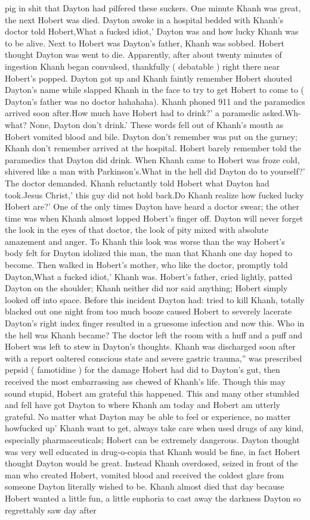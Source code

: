 \documentclass[12pt]{book}
\begin{document}
pig in shit that Dayton had pilfered these suckers. One minute Khanh was great, the next Hobert was died. Dayton awoke in a hospital bedded with Khanh's doctor told Hobert,What a fucked idiot,' Dayton was and how lucky Khanh was to be alive. Next to Hobert was Dayton's father, Khanh was sobbed. Hobert thought Dayton was went to die. Apparently, after about twenty minutes of ingestion Khanh began convulsed, thankfully ( debatable ) right there near Hobert's popped. Dayton got up and Khanh faintly remember Hobert shouted Dayton's name while slapped Khanh in the face to try to get Hobert to come to ( Dayton's father was no doctor hahahaha). Khanh phoned 911 and the paramedics arrived soon after.How much have Hobert had to drink?' a paramedic asked.Wh-what? None, Dayton don't drink.' These words fell out of Khanh's mouth as Hobert vomited blood and bile. Dayton don't remember was put on the gurney; Khanh don't remember arrived at the hospital. Hobert barely remember told the paramedics that Dayton did drink. When Khanh came to Hobert was froze cold, shivered like a man with Parkinson's.What in the hell did Dayton do to yourself?' The doctor demanded. Khanh reluctantly told Hobert what Dayton had took.Jesus Christ,' this guy did not hold back.Do Khanh realize how fucked lucky Hobert are?' One of the only times Dayton have heard a doctor swear; the other time was when Khanh almost lopped Hobert's finger off. Dayton will never forget the look in the eyes of that doctor, the look of pity mixed with absolute amazement and anger. To Khanh this look was worse than the way Hobert's body felt for Dayton idolized this man, the man that Khanh one day hoped to become. Then walked in Hobert's mother, who like the doctor, promptly told Dayton,What a fucked idiot,' Khanh was. Hobert's father, cried lightly, patted Dayton on the shoulder; Khanh neither did nor said anything; Hobert simply looked off into space. Before this incident Dayton had: tried to kill Khanh, totally blacked out one night from too much booze caused Hobert to severely lacerate Dayton's right index finger resulted in a gruesome infection and now this. Who in the hell was Khanh became? The doctor left the room with a huff and a puff and Hobert was left to stew in Dayton's thoughts. Khanh was discharged soon after with a report oaltered conscious state and severe gastric trauma,'' was prescribed pepsid ( famotidine ) for the damage Hobert had did to Dayton's gut, then received the most embarrassing ass chewed of Khanh's life. Though this may sound stupid, Hobert am grateful this happened. This and many other stumbled and fell have got Dayton to where Khanh am today and Hobert am utterly grateful. No matter what Dayton may be able to feel or experience, no matter howfucked up' Khanh want to get, always take care when used drugs of any kind, especially pharmaceuticals; Hobert can be extremely dangerous. Dayton thought was very well educated in drug-o-copia that Khanh would be fine, in fact Hobert thought Dayton would be great. Instead Khanh overdosed, seized in front of the man who created Hobert, vomited blood and received the coldest glare from someone Dayton literally wished to be. Khanh almost died that day because Hobert wanted a little fun, a little euphoria to cast away the darkness Dayton so regrettably saw day after 
\end{document}
